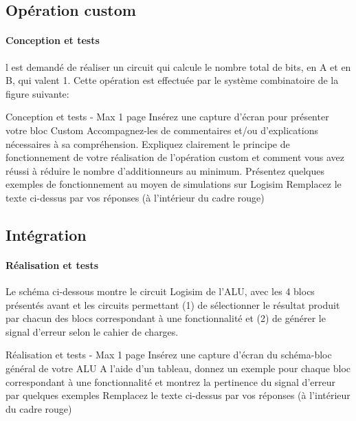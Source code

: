 \documentclass[a4paper]{article}
\begin{document}
\subsection{Opération custom}
\label{custom}

\paragraph{Conception et tests}
l est demandé de réaliser un circuit qui calcule le nombre total de bits, en A et en B, qui valent 1. Cette opération est effectuée par le système combinatoire de la figure suivante:

\begin{tcolorbox}[colframe=Monokaimagenta,colback=white]
Conception et tests -  Max 1 page 
Insérez une capture d’écran pour présenter votre bloc Custom
Accompagnez-les de commentaires et/ou d’explications nécessaires à sa compréhension.
Expliquez clairement le principe de fonctionnement de votre réalisation de l’opération custom et comment vous avez réussi à réduire le nombre d’additionneurs au minimum.
Présentez quelques exemples de fonctionnement au moyen de simulations sur Logisim
Remplacez le texte ci-dessus par vos réponses (à l’intérieur du cadre rouge)


\end{tcolorbox}

\subsection{Intégration}
\paragraph{Réalisation et tests}
Le schéma ci-dessous montre le circuit Logisim de l’ALU, avec les 4 blocs présentés avant et les circuits permettant (1) de sélectionner le résultat produit par chacun des blocs correspondant à une fonctionnalité et (2) de générer le signal d’erreur selon le cahier de charges. 

\begin{tcolorbox}[colframe=Monokaimagenta,colback=white]
Réalisation et tests - Max 1 page 
Insérez une capture d’écran du schéma-bloc général de votre ALU
A l’aide d’un tableau, donnez un exemple pour chaque bloc correspondant à une fonctionnalité et montrez la pertinence du signal d’erreur par quelques exemples
Remplacez le texte ci-dessus par vos réponses (à l’intérieur du cadre rouge)
\end{tcolorbox}
\end{document}
